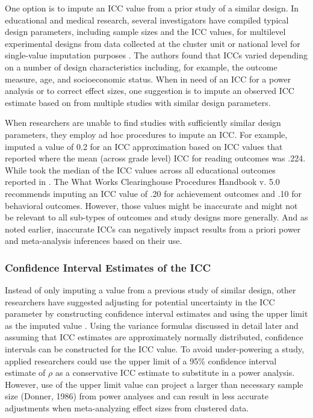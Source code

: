 One option is to impute an ICC value from a prior study of a similar design. In educational and medical research, several investigators have compiled typical design parameters, including sample sizes and the ICC values, for multilevel experimental designs from data collected at the cluster unit or national level for single-value imputation purposes \cite{bloomUsingCovariatesImprove2007, hedbergReferenceValuesWithinDistrict2014,hedgesIntraclassCorrelationValues2007a}. The authors found that ICCs varied depending on a number of design characteristics including, for example, the outcome measure, age, and socioeconomic status. When in need of an ICC for a power analysis or to correct effect sizes, one suggestion is to impute  an observed ICC estimate based on from multiple studies with similar design parameters. 

When researchers are unable to find studies with sufficiently similar design parameters, they employ ad hoc procedures to impute an ICC. For example,  imputed a value of 0.2 for an ICC approximation based on ICC values that  reported where the mean (across grade level) ICC for reading outcomes was .224. While  took the median of the ICC values across all educational outcomes reported in . The What Works Clearinghouse Procedures Handbook v. 5.0  recommends imputing an ICC value of .20 for achievement outcomes and .10 for behavioral outcomes. However, those values might be inaccurate and might not be relevant to all sub-types of outcomes and study designs more generally. And as noted earlier, inaccurate ICCs can negatively impact results from a priori power and meta-analysis inferences based on their use.
  
\subsubsection{Confidence Interval Estimates of the ICC}
Instead of only imputing a value from a previous study of similar design, other researchers have suggested adjusting for potential uncertainty in the ICC parameter by constructing confidence interval estimates and using the upper limit as the imputed value \cite{donner1986}. Using the variance formulas discussed in detail later and assuming that ICC estimates are approximately normally distributed, confidence intervals can be constructed for the ICC value. To avoid under-powering a study, applied researchers could use the upper limit of a 95\%  confidence interval estimate of $\rho$ as a conservative ICC estimate to substitute in a power analysis. However, use of the upper limit value can project a larger than necessary sample size (Donner, 1986) from power analyses and can result in less accurate adjustments when meta-analyzing effect sizes from clustered data. 

